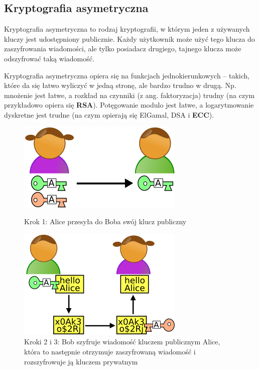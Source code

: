 \documentclass[a4paper,12pt,oneside]{book}
\begin{document}
			\subsection*{Kryptografia asymetryczna}
			
			Kryptografia asymetryczna to rodzaj kryptografii, w którym jeden z używanych kluczy jest udostępniony publicznie. Każdy użytkownik może użyć tego klucza do zaszyfrowania wiadomości, ale tylko posiadacz drugiego, tajnego klucza może odszyfrować taką wiadomość.
			
			Kryptografia asymetryczna opiera się na funkcjach jednokierunkowych – takich, które da się łatwo wyliczyć w jedną stronę, ale bardzo trudno w drugą. Np. mnożenie jest łatwe, a rozkład na czynniki (z ang. faktoryzacja) trudny (na czym przykładowo opiera się \textbf{RSA}). Potęgowanie modulo jest łatwe, a logarytmowanie dyskretne jest trudne (na czym opierają się ElGamal, DSA i \textbf{ECC}).
			
			\begin{figure}[h]
				\centering\includegraphics[scale=0.45]{krypt_asym_1.png}
				\caption{Krok 1: Alice przesyła do Boba swój klucz publiczny}
				
				\hspace{5pt}
				
				\centering\includegraphics[scale=0.45]{krypt_asym_2.png}
				\caption{Kroki 2 i 3: Bob szyfruje wiadomość kluczem publicznym Alice, która to następnie otrzymuje zaszyfrowaną wiadomość i rozszyfrowuje ją kluczem prywatnym}
			\end{figure}
			
\end{document}
